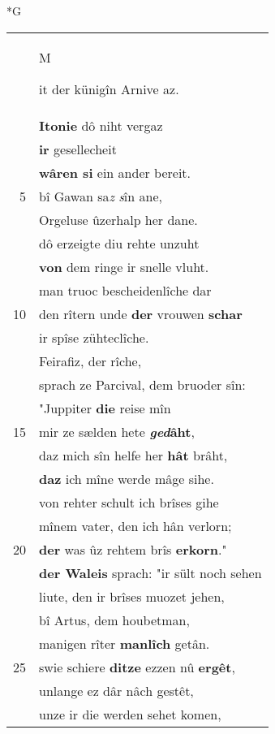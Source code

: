 \documentclass[8pt,a4paper,notitlepage]{article}
\begin{document}
\newpage
\begin{table}[ht]
\begin{minipage}[t]{0.5\linewidth}
\small
\begin{center}*G
\end{center}
\begin{tabular}{rl}
 & \begin{large}M\end{large}it der künigîn Arnive az.\\ 
 & \textbf{Itonie} dô niht vergaz\\ 
 & \textbf{ir} gesellecheit\\ 
 & \textbf{wâren si} ein ander bereit.\\ 
5 & bî Gawan sa\textit{z} \textit{s}în ane,\\ 
 & Orgeluse ûzerhalp her dane.\\ 
 & dô erzeigte diu rehte unzuht\\ 
 & \textbf{von} dem ringe ir snelle vluht.\\ 
 & man truoc bescheidenlîche dar\\ 
10 & den rîtern unde \textbf{der} vrouwen \textbf{schar}\\ 
 & ir spîse zühteclîche.\\ 
 & Feirafiz, der rîche,\\ 
 & sprach ze Parcival, dem bruoder sîn:\\ 
 & "Juppiter \textbf{die} reise mîn\\ 
15 & mir ze sælden hete \textbf{\textit{ged}âht},\\ 
 & daz mich sîn helfe her \textbf{hât} brâht,\\ 
 & \textbf{daz} ich mîne werde mâge sihe.\\ 
 & von rehter schult ich brîses gihe\\ 
 & mînem vater, den ich hân verlorn;\\ 
20 & \textbf{der} was ûz rehtem brîs \textbf{erkorn}."\\ 
 & \textbf{der Waleis} sprach: "ir sült noch sehen\\ 
 & liute, den ir brîses muozet jehen,\\ 
 & bî Artus, dem houbetman,\\ 
 & manigen rîter \textbf{manlîch} getân.\\ 
25 & swie schiere \textbf{ditze} ezzen nû \textbf{ergêt},\\ 
 & unlange ez dâr nâch gestêt,\\ 
 & unze ir die werden sehet komen,\\ 

\end{tabular}
\end{minipage}
\end{table}
\end{document}
